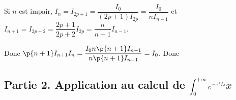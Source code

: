 \documentclass[a4paper,french,bookmarks]{article}
\begin{document}
\begin{enumerate}
{            
            Si $n$ est impair, $I_{n} = I_{2p+1} = \dfrac{I_0}{(2p+1)I_{2p}} = \dfrac{I_0}{nI_{n-1}}$ et $I_{n+1} = I_{2p+2} =\dfrac{2p+1}{2p+2}I_{2p} = \dfrac{n}{n+1}I_{n-1}$.
            
            Donc $\p{n+1}I_{n+1}I_n = \dfrac{I_0n\p{n+1}I_{n-1}}{n\p{n+1}I_{n-1}} = I_0$. Donc 
        }
    \end{enumerate}
    
    
\subsection*{Partie 2. Application au calcul de $\displaystyle \int_0^{+\infty} e^{-\sfrac{x^2}{2}}${$x$}}
\end{document}
